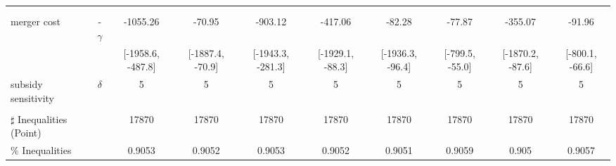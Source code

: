 \begin{tabular}{@{\extracolsep{5pt}}lccccccccc}
 &  &  &  &  &  &  &  &  &  \\
 &  &  &  &  &  &  &  &  &  \\
merger cost & -$\gamma$ & -1055.26 & -70.95 & -903.12 & -417.06 & -82.28 & -77.87 & -355.07 & -91.96 \\
 &  & [-1958.6, -487.8] & [-1887.4, -70.9] & [-1943.3, -281.3] & [-1929.1, -88.3] & [-1936.3, -96.4] & [-799.5, -55.0] & [-1870.2, -87.6] & [-800.1, -66.6] \\
subsidy sensitivity & $\delta$ & 5 & 5 & 5 & 5 & 5 & 5 & 5 & 5 \\
 &  &  &  &  &  &  &  &  &  \\
\hline 
$\sharp$ Inequalities (Point) &  & 17870 & 17870 & 17870 & 17870 & 17870 & 17870 & 17870 & 17870 \\
\% Inequalities &  & 0.9053 & 0.9052 & 0.9053 & 0.9052 & 0.9051 & 0.9059 & 0.905 & 0.9057 \\
\bottomrule 
\end{tabular}
